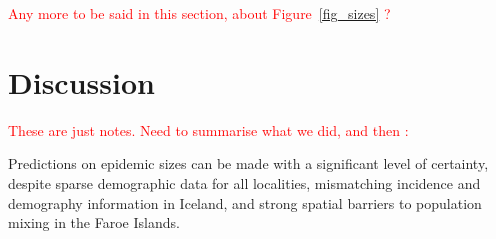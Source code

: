 \documentclass[10pt]{article}
\begin{document}
\textcolor{red}{Any more to be said in this section, about Figure~\ref{fig_sizes} ?}




































\section*{Discussion}

\textcolor{red}{These are just notes. Need to summarise what we did, and then :}

Predictions on epidemic sizes can be made with a significant level of certainty, despite sparse demographic data for all localities, mismatching incidence and demography information in Iceland, and strong spatial barriers to population mixing in the Faroe Islands. 
\end{document}
